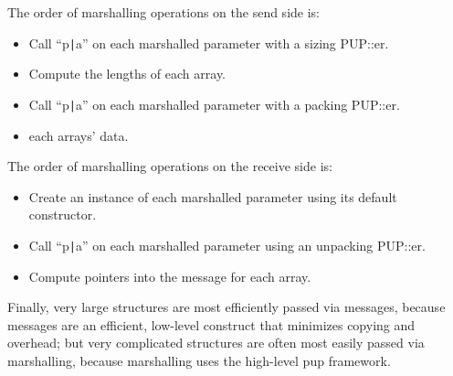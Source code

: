 The order of marshalling operations on the send side is:
\begin{itemize}
\item Call ``p\verb.|.a'' on each marshalled parameter with a sizing PUP::er.
\item Compute the lengths of each array.
\item Call ``p\verb.|.a'' on each marshalled parameter with a packing PUP::er.
\item {} each arrays' data.
\end{itemize}

The order of marshalling operations on the receive side is:
\begin{itemize}
\item Create an instance of each marshalled parameter using its default constructor.
\item Call ``p\verb.|.a'' on each marshalled parameter using an unpacking PUP::er.
\item Compute pointers into the message for each array.
\end{itemize}

Finally, very large structures are most efficiently passed via messages,
because messages are an efficient, low-level construct that minimizes copying
and overhead; but very complicated structures are often most easily passed via 
marshalling, because marshalling uses the high-level pup framework.


